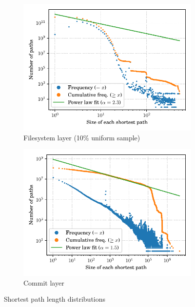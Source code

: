 \begin{figure}
    \centering
    \begin{subfigure}{.49\textwidth}
        \includegraphics[width=\linewidth]{img/topology/shortestpath/dir+cnt}
        \caption{Filesystem layer (10\% uniform sample)}%
        \label{fig:shortestpath_dir+cnt}
    \end{subfigure}\hfill
    \begin{subfigure}{.49\textwidth}
        \includegraphics[width=\linewidth]{img/topology/shortestpath/rev}
        \caption{Commit layer}%
        \label{fig:shortestpath_rev}
    \end{subfigure}
    \caption{Shortest path length distributions}%
    \label{fig:shortestpath}
\end{figure}


